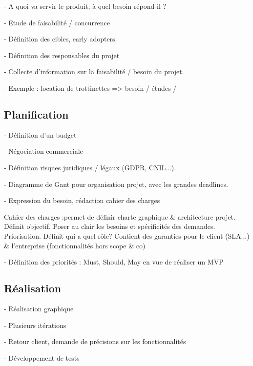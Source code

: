 - A quoi va servir le produit, à quel besoin répond-il ?

- Etude de faisabilité / concurrence

- Définition des cibles, early adopters.

- Définition des responsables du projet

- Collecte d'information sur la faisabilité / besoin du projet.

- Exemple : location de trottinettes => besoin / études /



\subsection{Planification}

- Définition d'un budget

- Négociation commerciale

- Définition risques juridiques / légaux (GDPR, CNIL...).

- Diagramme de Gant pour organisation projet, avec les grandes deadlines.

- Expression du besoin, rédaction cahier des charges

Cahier des charges :permet de définir charte graphique \& architecture projet. Définit objectif. Poser au clair les besoins et spécificités des demandes. Priorisation. Définit qui a quel rôle? Contient des garanties pour le client (SLA...) \& l'entreprise (fonctionnalités hors scope \& co)

- Définition des priorités : Must, Should, May en vue de réaliser un MVP


\subsection{Réalisation}

- Réalisation graphique

- Plusieurs itérations

- Retour client, demande de précisions sur les fonctionnalités

- Développement de tests


